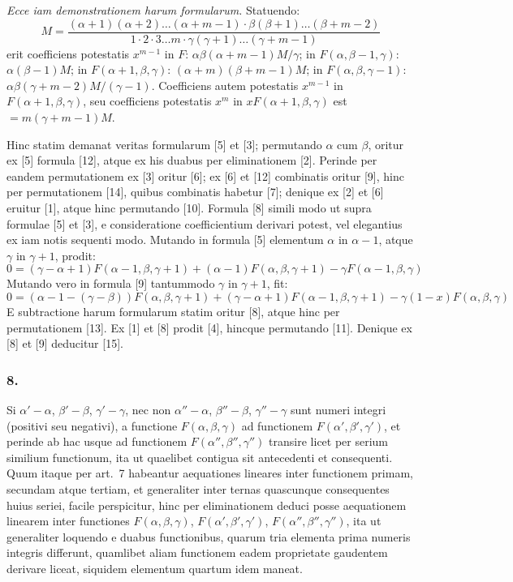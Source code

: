 \documentclass[12pt,a4paper]{article}
\newcommand{\1}{\ensuremath{\mathrlap{\,|\,}}} %
\begin{document}
\textit{Ecce iam demonstrationem harum formularum.} Statuendo:
\[M = \frac{(\alpha+1)(\alpha+2)\ldots(\alpha+m-1)\cdot\beta(\beta+1)\ldots(\beta+m-2)}{1\cdot 2\cdot 3\ldots m \cdot \gamma(\gamma+1)\ldots(\gamma+m-1)}\]
erit coefficiens potestatis $x^{m-1}$ in $F$: $\alpha\beta(\alpha+m-1)M/\gamma$; in $F(\alpha, \beta-1, \gamma)$: $\alpha(\beta-1)M$; in $F(\alpha+1, \beta, \gamma)$: $(\alpha+m)(\beta+m-1)M$; in $F(\alpha, \beta, \gamma-1)$: $\alpha\beta(\gamma+m-2)M/(\gamma-1)$. Coefficiens autem potestatis $x^{m-1}$ in $F(\alpha+1, \beta, \gamma)$, seu coefficiens potestatis $x^m$ in $xF(\alpha+1, \beta, \gamma)$ est $= m(\gamma+m-1)M$.

Hinc statim demanat veritas formularum [5] et [3]; permutando $\alpha$ cum $\beta$, oritur ex [5] formula [12], atque ex his duabus per eliminationem [2]. Perinde per eandem permutationem ex [3] oritur [6]; ex [6] et [12] combinatis oritur [9], hinc per permutationem [14], quibus combinatis habetur [7]; denique ex [2] et [6] eruitur [1], atque hinc permutando [10]. Formula [8] simili modo ut supra formulae [5] et [3], e consideratione coefficientium derivari potest, vel elegantius ex iam notis sequenti modo. Mutando in formula [5] elementum $\alpha$ in $\alpha-1$, atque $\gamma$ in $\gamma+1$, prodit:
\[0 = (\gamma - \alpha + 1)F(\alpha-1, \beta, \gamma+1) + (\alpha-1)F(\alpha, \beta, \gamma+1) - \gamma F(\alpha-1, \beta, \gamma)\]
Mutando vero in formula [9] tantummodo $\gamma$ in $\gamma+1$, fit:
\[0 = (\alpha - 1 - (\gamma - \beta))F(\alpha, \beta, \gamma+1) + (\gamma - \alpha + 1)F(\alpha-1, \beta, \gamma+1) - \gamma(1-x)F(\alpha, \beta, \gamma)\]
E subtractione harum formularum statim oritur [8], atque hinc per permutationem [13]. Ex [1] et [8] prodit [4], hincque permutando [11]. Denique ex [8] et [9] deducitur [15].

\subsubsection*{8.}

Si $\alpha' - \alpha$, $\beta' - \beta$, $\gamma' - \gamma$, nec non $\alpha'' - \alpha$, $\beta'' - \beta$, $\gamma'' - \gamma$ sunt numeri integri (positivi seu negativi), a functione $F(\alpha, \beta, \gamma)$ ad functionem $F(\alpha', \beta', \gamma')$, et perinde ab hac usque ad functionem $F(\alpha'', \beta'', \gamma'')$ transire licet per serium similium functionum, ita ut quaelibet contigua sit antecedenti et consequenti. Quum itaque per art.~7 habeantur aequationes lineares inter functionem primam, secundam atque tertiam, et generaliter inter ternas quascunque consequentes huius seriei, facile perspicitur, hinc per eliminationem deduci posse aequationem linearem inter functiones $F(\alpha, \beta, \gamma)$, $F(\alpha', \beta', \gamma')$, $F(\alpha'', \beta'', \gamma'')$, ita ut generaliter loquendo e duabus functionibus, quarum tria elementa prima numeris integris differunt, quamlibet aliam functionem eadem proprietate gaudentem derivare liceat, siquidem elementum quartum idem maneat.
\end{document}
